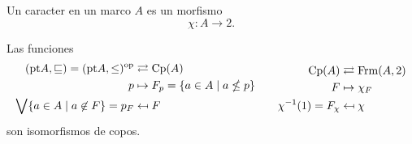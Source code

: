 
\begin{definition}
    Un caracter en un marco $A$ es un morfismo
    \[
        \chi:A\to 2
    .\]
\end{definition}

\begin{theorem}
    Las funciones
    \[
        \begin{aligned}
            (\mathrm{pt} A,\sqsubseteq)
            =(\mathrm{pt} A,\leq)^{\mathrm{op}} &\rightleftarrows \mathrm{Cp}(A) \\
            p &\mapsto F_p=\{a\in A\mid a\nleq p\} \\
            \bigvee\{a\in A\mid a\not\in F\} = p_F &\mapsfrom F
        \end{aligned}
        \qquad
        \begin{aligned}
            \mathrm{Cp}(A) &\rightleftarrows \mathrm{Frm}(A,2) \\
            F &\mapsto \chi_F \\
            \chi^{-1}(1) = F_\chi &\mapsfrom \chi
        \end{aligned}
    \]
    son isomorfismos de copos.
\end{theorem}
